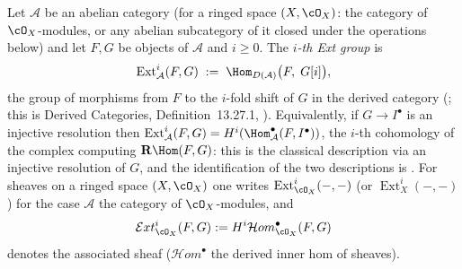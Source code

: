 \begin{definition}[Extensions]
\label{def:pc-ext}
Let $\mathcal A$ be an abelian category (for a ringed space
$(X,\cO_X)$: the category of $\cO_X$-modules, or any abelian
subcategory of it closed under the operations below) and let $F,G$ be objects of $\mathcal A$ and
$i\ge0$.  The \emph{$i$-th Ext group} is
\[
\operatorname{Ext}^{i}_{\mathcal A}(F,G)
\;:=\;\Hom_{D(\mathcal A)}\bigl(F,\;G[i]\bigr),
\]
the group of morphisms from $F$ to the $i$-fold shift of $G$ in the
derived category (; this is Derived
Categories, Definition~13.27.1,
).  Equivalently, if
$G\to I^\bullet$ is an injective resolution then
$\operatorname{Ext}^{i}_{\mathcal A}(F,G)
=H^{i}(\Hom^{\bullet}_{\mathcal A}(F,I^\bullet))$, the $i$-th
cohomology of the complex computing $\mathbf R\Hom(F,G)$: this is
the classical description via an injective resolution of $G$, and
the identification of the two descriptions is
.  For sheaves on a
ringed space $(X,\cO_X)$ one writes $\operatorname{Ext}^{i}_{\cO_X}(-,-)$ (or
$\operatorname{Ext}^{i}_X(-,-)$) for the case
$\mathcal A$ the category of $\cO_X$-modules, and
\[
\mathcal{E}xt^{i}_{\cO_X}(F,G):=H^i\mathcal{H}om^{\bullet}_{\cO_X}(F,G)
\]
denotes the associated sheaf ($\mathcal{H}om^{\bullet}$ the derived
inner hom of sheaves).
\mathlibok\ 
\end{definition}

